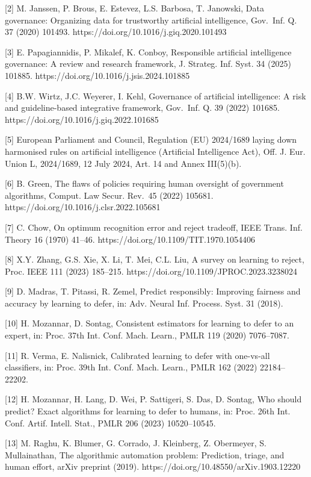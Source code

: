 \documentclass[
  11pt,
]{article}
\begin{document}
{[}2{]} M. Janssen, P. Brous, E. Estevez, L.S. Barbosa, T. Janowski,
Data governance: Organizing data for trustworthy artificial
intelligence, Gov.~Inf. Q. 37 (2020) 101493.
https://doi.org/10.1016/j.giq.2020.101493

{[}3{]} E. Papagiannidis, P. Mikalef, K. Conboy, Responsible artificial
intelligence governance: A review and research framework, J. Strateg.
Inf. Syst. 34 (2025) 101885. https://doi.org/10.1016/j.jsis.2024.101885

{[}4{]} B.W. Wirtz, J.C. Weyerer, I. Kehl, Governance of artificial
intelligence: A risk and guideline-based integrative framework,
Gov.~Inf. Q. 39 (2022) 101685. https://doi.org/10.1016/j.giq.2022.101685

{[}5{]} European Parliament and Council, Regulation (EU) 2024/1689
laying down harmonised rules on artificial intelligence (Artificial
Intelligence Act), Off. J. Eur. Union L, 2024/1689, 12 July 2024, Art.
14 and Annex III(5)(b).

{[}6{]} B. Green, The flaws of policies requiring human oversight of
government algorithms, Comput. Law Secur. Rev.~45 (2022) 105681.
https://doi.org/10.1016/j.clsr.2022.105681

{[}7{]} C. Chow, On optimum recognition error and reject tradeoff, IEEE
Trans. Inf. Theory 16 (1970) 41--46.
https://doi.org/10.1109/TIT.1970.1054406

{[}8{]} X.Y. Zhang, G.S. Xie, X. Li, T. Mei, C.L. Liu, A survey on
learning to reject, Proc. IEEE 111 (2023) 185--215.
https://doi.org/10.1109/JPROC.2023.3238024

{[}9{]} D. Madras, T. Pitassi, R. Zemel, Predict responsibly: Improving
fairness and accuracy by learning to defer, in: Adv. Neural Inf.
Process. Syst. 31 (2018).

{[}10{]} H. Mozannar, D. Sontag, Consistent estimators for learning to
defer to an expert, in: Proc. 37th Int. Conf. Mach. Learn., PMLR 119
(2020) 7076--7087.

{[}11{]} R. Verma, E. Nalisnick, Calibrated learning to defer with
one-vs-all classifiers, in: Proc. 39th Int. Conf. Mach. Learn., PMLR 162
(2022) 22184--22202.

{[}12{]} H. Mozannar, H. Lang, D. Wei, P. Sattigeri, S. Das, D. Sontag,
Who should predict? Exact algorithms for learning to defer to humans,
in: Proc. 26th Int. Conf. Artif. Intell. Stat., PMLR 206 (2023)
10520--10545.

{[}13{]} M. Raghu, K. Blumer, G. Corrado, J. Kleinberg, Z. Obermeyer, S.
Mullainathan, The algorithmic automation problem: Prediction, triage,
and human effort, arXiv preprint (2019).
https://doi.org/10.48550/arXiv.1903.12220
\end{document}
